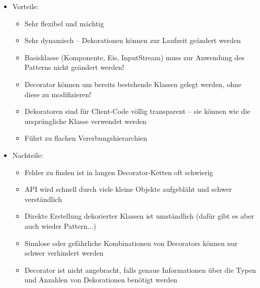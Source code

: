 \begin{itemize}
	\item Vorteile:
	\begin{itemize}
\item Sehr flexibel und mächtig
\item Sehr dynamisch – Dekorationen können zur Laufzeit geändert werden
\item Basisklasse (Komponente, Eis, InputStream) muss zur Anwendung des Patterns nicht geändert werden!
\item Decorator können um bereits bestehende Klassen gelegt werden, ohne diese zu modifizieren!
\item Dekoratoren sind für Client-Code völlig transparent – sie können wie die ursprüngliche Klasse verwendet werden
\item Führt zu flachen Vererbungshierarchien
	\end{itemize}
	\item Nachteile:
	\begin{itemize}
\item Fehler zu finden ist in langen Decorator-Ketten oft schwierig
\item API wird schnell durch viele kleine Objekte aufgebläht und schwer verständlich
\item Direkte Erstellung dekorierter Klassen ist umständlich (dafür gibt es aber auch wieder Pattern...)
\item  Sinnlose oder gefährliche Kombinationen von Decorators können nur schwer verhindert werden
\item Decorator ist nicht angebracht, falls genaue Informationen über die Typen und Anzahlen von Dekorationen benötigt werden
	\end{itemize}
\end{itemize}
%
%
%
